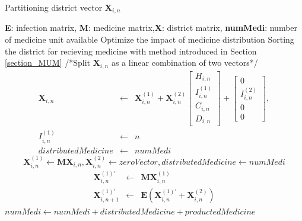 \documentclass[12pt,a4paper,titlepage]{article}
\begin{document}
\begin{algorithm}[h] 
    \caption{Partitioning district vector \textbf{X}$_{i,n}$} 
    \begin{algorithmic}[1]
    \REQUIRE \textbf{E}: infection matrix, \textbf{M}: medicine matrix,\textbf{X}: district matrix, \textbf{numMedi}: number of medicine unit available
    \ENSURE Optimize the impact of medicine distribution
    \STATE Sorting the district for recieving medicine with method introduced in Section \ref{section_MUM}
            \STATE /*Split \textbf{X}$_{i,n}$ as a linear combination of two vectors*/
            \begin{eqnarray*}
            \textbf{X}_{i,n} &\gets & \textbf{X}_{i,n}^{(1)} + \textbf{X}_{i,n}^{(2)}
                             \begin{bmatrix}
                                        H_{i,n}\\ I_{i,n}^{(1)}\\ C_{i,n}\\ D_{i,n}
                                     \end{bmatrix}
                                     +
                                     \begin{bmatrix}
                                        0\\ I_{i,n}^{(2)}\\ 0\\ 0
                                     \end{bmatrix},\\
            I_{i,n}^{(1)}  & \gets &  n\\
            distributedMedicine &\gets &numMedi
            \end{eqnarray*}   
        \ELSE
            \STATE \begin{equation*}
                     \textbf{X}_{i,n}^{(1)} \gets \textbf{MX}_{i,n}, \textbf{X}_{i,n}^{(2)} \gets zeroVector, distributedMedicine \gets numMedi
                    \end{equation*}
        \ENDIF
        \begin{eqnarray*}
            \textbf{X}_{i,n}^{(1)'} & \gets & \textbf{MX}_{i,n}^{(1)}\\
            \textbf{X}_{i,n+1}^{(1)'} & \gets & \textbf{E}(\textbf{X}_{i,n}^{(1)'} + \textbf{X}_{i,n}^{(2)})
        \end{eqnarray*}
    \STATE $numMedi \gets numMedi + distributedMedicine + productedMedicine$
    \ENDWHILE
        \label{algm_partition}

\end{algorithmic} 
\end{algorithm}
\end{document}
